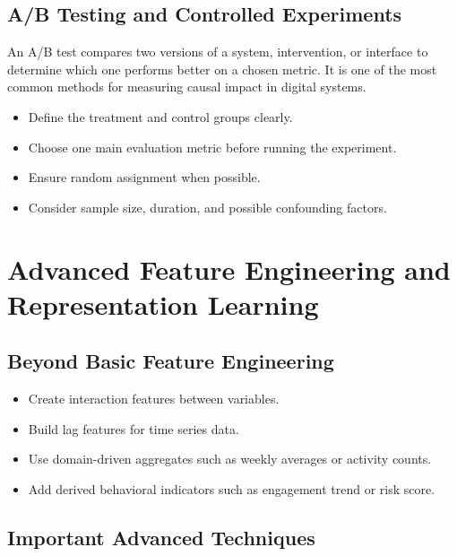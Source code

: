 \documentclass[11pt,a4paper]{article}
\begin{document}
\subsection{A/B Testing and Controlled Experiments}

\begin{definitionbox}[A/B Test]
An A/B test compares two versions of a system, intervention, or interface to determine which one performs better on a chosen metric. It is one of the most common methods for measuring causal impact in digital systems.
\end{definitionbox}

\begin{itemize}[leftmargin=*]
  \item Define the treatment and control groups clearly.
  \item Choose one main evaluation metric before running the experiment.
  \item Ensure random assignment when possible.
  \item Consider sample size, duration, and possible confounding factors.
\end{itemize}

\section{Advanced Feature Engineering and Representation Learning}

\subsection{Beyond Basic Feature Engineering}

\begin{itemize}[leftmargin=*]
  \item Create interaction features between variables.
  \item Build lag features for time series data.
  \item Use domain-driven aggregates such as weekly averages or activity counts.
  \item Add derived behavioral indicators such as engagement trend or risk score.
\end{itemize}

\subsection{Important Advanced Techniques}
\end{document}
